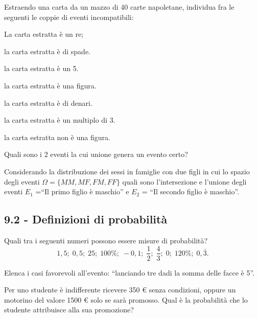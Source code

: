 \begin{esercizio}
 \label{ese:9.4}
Estraendo una carta da un mazzo di 40 carte napoletane, individua fra le seguenti le coppie di eventi incompatibili:
\begin{multicols}{2}
\begin{enumeratea}
\item La carta estratta è un re;
\item la carta estratta è di spade.
\item la carta estratta è un 5.
\item la carta estratta è una figura.
\item la carta estratta è di denari.
\item la carta estratta è un multiplo di 3.
\item la carta estratta non è una figura.
\end{enumeratea}
\end{multicols}
Quali sono i 2 eventi la cui unione genera un evento certo?
\end{esercizio}

\begin{esercizio}
 \label{ese:9.5}
 Considerando la distribuzione dei sessi in famiglie con due figli in cui lo spazio degli eventi $\Omega =\{{MM}, {MF}, {FM}, {FF}\}$ quali sono l'intersezione e l'unione degli eventi $E_1$ =“Il primo figlio è maschio” e $E_2$ = “Il secondo figlio è maschio”.
\end{esercizio}

\subsection*{9.2 - Definizioni di probabilità}

\begin{esercizio}
 \label{ese:9.6}
Quali tra i seguenti numeri possono essere misure di probabilità? \[ 1,5;\;0,5;\;25;\;100\%;\;-0,1;\;\frac 1 2;\;\frac 4 3;\;0;\;120\%;\;0,\bar 3. \]
\end{esercizio}

\begin{esercizio}
 \label{ese:9.7}
Elenca i casi favorevoli all'evento: “lanciando tre dadi la somma delle facce è 5”.
\end{esercizio}

\begin{esercizio}[\Ast]
 \label{ese:9.8}
Per uno studente è indifferente ricevere 350 € senza condizioni, oppure un motorino del valore 1500 € solo se sarà promosso. Qual è la probabilità che lo studente attribuisce alla sua promozione?
\end{esercizio}

